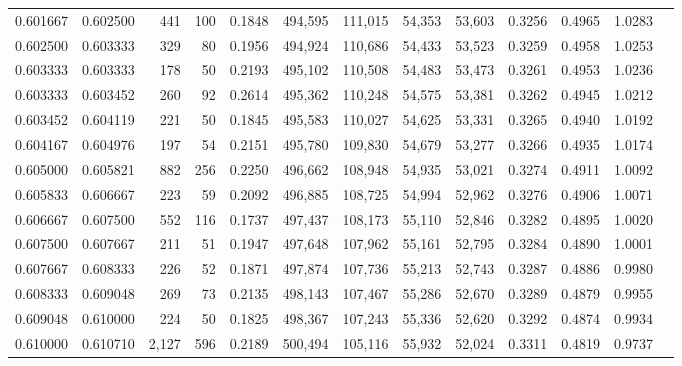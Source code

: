 \begin{tabular}{rrrrrrrrrrrrr}
0.601667 & 0.602500 &   441 & 100 &                                     0.1848 & 494,595 & 111,015 &  54,353 &  53,603 & 0.3256 & 0.4965 & 1.0283 \\
0.602500 & 0.603333 &   329 &  80 &                                     0.1956 & 494,924 & 110,686 &  54,433 &  53,523 & 0.3259 & 0.4958 & 1.0253 \\
0.603333 & 0.603333 &   178 &  50 &                                     0.2193 & 495,102 & 110,508 &  54,483 &  53,473 & 0.3261 & 0.4953 & 1.0236 \\
0.603333 & 0.603452 &   260 &  92 &                                     0.2614 & 495,362 & 110,248 &  54,575 &  53,381 & 0.3262 & 0.4945 & 1.0212 \\
0.603452 & 0.604119 &   221 &  50 &                                     0.1845 & 495,583 & 110,027 &  54,625 &  53,331 & 0.3265 & 0.4940 & 1.0192 \\
0.604167 & 0.604976 &   197 &  54 &                                     0.2151 & 495,780 & 109,830 &  54,679 &  53,277 & 0.3266 & 0.4935 & 1.0174 \\
0.605000 & 0.605821 &   882 & 256 &                                     0.2250 & 496,662 & 108,948 &  54,935 &  53,021 & 0.3274 & 0.4911 & 1.0092 \\
0.605833 & 0.606667 &   223 &  59 &                                     0.2092 & 496,885 & 108,725 &  54,994 &  52,962 & 0.3276 & 0.4906 & 1.0071 \\
0.606667 & 0.607500 &   552 & 116 &                                     0.1737 & 497,437 & 108,173 &  55,110 &  52,846 & 0.3282 & 0.4895 & 1.0020 \\
0.607500 & 0.607667 &   211 &  51 &                                     0.1947 & 497,648 & 107,962 &  55,161 &  52,795 & 0.3284 & 0.4890 & 1.0001 \\
0.607667 & 0.608333 &   226 &  52 &                                     0.1871 & 497,874 & 107,736 &  55,213 &  52,743 & 0.3287 & 0.4886 & 0.9980 \\
0.608333 & 0.609048 &   269 &  73 &                                     0.2135 & 498,143 & 107,467 &  55,286 &  52,670 & 0.3289 & 0.4879 & 0.9955 \\
0.609048 & 0.610000 &   224 &  50 &                                     0.1825 & 498,367 & 107,243 &  55,336 &  52,620 & 0.3292 & 0.4874 & 0.9934 \\
0.610000 & 0.610710 & 2,127 & 596 &                                     0.2189 & 500,494 & 105,116 &  55,932 &  52,024 & 0.3311 & 0.4819 & 0.9737 \\

\end{tabular}
